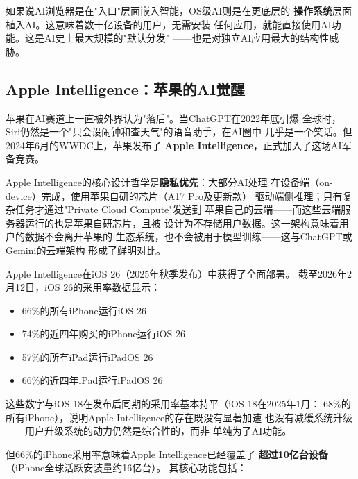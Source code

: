 如果说AI浏览器是在"入口"层面嵌入智能，OS级AI则是在更底层的
\textbf{操作系统}层面植入AI。这意味着数十亿设备的用户，无需安装
任何应用，就能直接使用AI功能。这是AI史上最大规模的"默认分发"
——也是对独立AI应用最大的结构性威胁。

\subsection{Apple Intelligence：苹果的AI觉醒}
\label{subsec:apple-intelligence}

苹果在AI赛道上一直被外界认为"落后"。当ChatGPT在2022年底引爆
全球时，Siri仍然是一个"只会设闹钟和查天气"的语音助手，在AI圈中
几乎是一个笑话。但2024年6月的WWDC上，苹果发布了
\textbf{Apple Intelligence}，正式加入了这场AI军备竞赛。

Apple Intelligence的核心设计哲学是\textbf{隐私优先}：大部分AI处理
在设备端（on-device）完成，使用苹果自研的芯片（A17 Pro及更新款）
驱动端侧推理；只有复杂任务才通过"Private Cloud Compute"发送到
苹果自己的云端——而这些云端服务器运行的也是苹果自研芯片，且被
设计为不存储用户数据。这一架构意味着用户的数据不会离开苹果的
生态系统，也不会被用于模型训练——这与ChatGPT或Gemini的云端架构
形成了鲜明对比。

Apple Intelligence在iOS 26（2025年秋季发布）中获得了全面部署。
截至2026年2月12日，iOS 26的采用率数据显示：

\begin{itemize}
  \item 66\%的所有iPhone运行iOS 26
  \item 74\%的近四年购买的iPhone运行iOS 26
  \item 57\%的所有iPad运行iPadOS 26
  \item 66\%的近四年iPad运行iPadOS 26
\end{itemize}

这些数字与iOS 18在发布后同期的采用率基本持平（iOS 18在2025年1月：
68\%的所有iPhone），说明Apple Intelligence的存在既没有显著加速
也没有减缓系统升级——用户升级系统的动力仍然是综合性的，而非
单纯为了AI功能。

但66\%的iPhone采用率意味着Apple Intelligence已经覆盖了
\textbf{超过10亿台设备}（iPhone全球活跃安装量约16亿台）。
其核心功能包括：

